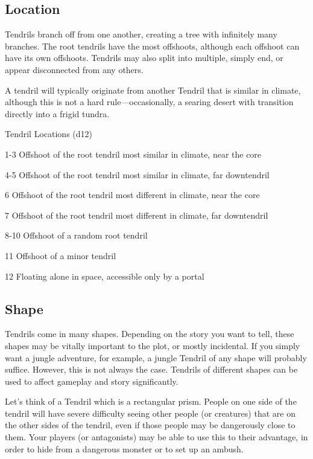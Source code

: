 \begin{multicols*}{2}
\subsection{Location}
Tendrils branch off from one another, creating a tree with infinitely many branches.
The root tendrils have the most offshoots, although each offshoot can have its own offshoots.
Tendrils may also split into multiple, simply end, or appear disconnected from any others.

A tendril will typically originate from another Tendril that is similar in climate, although this is not a hard rule---occasionally, a searing desert with transition directly into a frigid tundra.

\begin{rolltable}{Tendril Locations (d12)}
\item[1-3] Offshoot of the root tendril most similar in climate, near the core
\item[4-5] Offshoot of the root tendril most similar in climate, far downtendril
\item[6]  Offshoot of the root tendril most different in climate, near the core
\item[7] Offshoot of the root tendril most different in climate, far downtendril
\item[8-10] Offshoot of a random root tendril 
\item[11] Offshoot of a minor tendril
\item[12] Floating alone in space, accessible only by a portal
\end{rolltable}


\subsection{Shape}
Tendrils come in many shapes.
Depending on the story you want to tell, these shapes may be vitally important to the plot, or mostly incidental.
If you simply want a jungle adventure, for example, a jungle Tendril of any shape will probably suffice.
However, this is not always the case.
Tendrils of different shapes can be used to affect gameplay and story significantly.

Let's think of a Tendril which is a rectangular prism.
People on one side of the tendril will have severe difficulty seeing other people (or creatures) that are on the other sides of the tendril, even if those people may be dangerously close to them.
Your players (or antagonists) may be able to use this to their advantage, in order to hide from a dangerous monster or to set up an ambush.



\end{multicols*}
